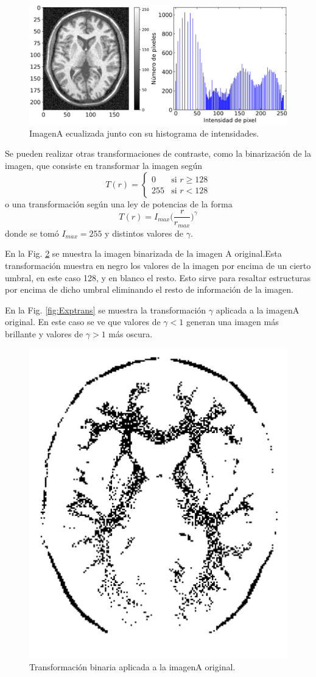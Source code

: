 \documentclass[11pt,twocolumn,twoside]{opticajnl}
\begin{document}
\begin{figure}[h]
    \centering
        \includegraphics[width=\linewidth]{Figuras/ImageA_EQ_hist.png}
    \caption{ImagenA ecualizada junto con su histograma de intensidades.} 
    \label{fig:EQ}
\end{figure}

Se pueden realizar otras transformaciones de contraste, como la binarización de la imagen, que consiste en transformar la imagen según 
\begin{equation}
    T(r) = 
    \begin{cases}
    0 & \text{si } r \geq 128 \\
    255 & \text{si } r < 128
    \end{cases}
\end{equation}
o una transformación según una ley de potencias de la forma
\begin{equation}
    T(r) = I_{max} \biggr( \frac{r}{r_{max}}\biggr)^\gamma
\end{equation}
donde se tomó $I_{max} = 255$ y distintos valores de $\gamma$.

En la Fig. \ref{fig:binarytrans} se muestra la imagen binarizada de la imagen A original.Esta transformación muestra en negro los valores de la imagen por encima de un cierto umbral, en este caso 128, y en blanco el resto. Esto sirve para resaltar estructuras por encima de dicho umbral eliminando el resto de información de la imagen. 

En la Fig. \ref{fig:Exptrans} se muestra la transformación $\gamma$ aplicada a la imagenA original. En este caso se ve que valores de $\gamma < 1$ generan una imagen más brillante y valores de $\gamma > 1 $ más oscura.

\begin{figure}[h]
    \centering
        \includegraphics[width=0.4\linewidth]{Figuras/ImageA_binary.png}
    \caption{Transformación binaria aplicada a la imagenA original.}
    \label{fig:binarytrans}
\end{figure}
\end{document}
